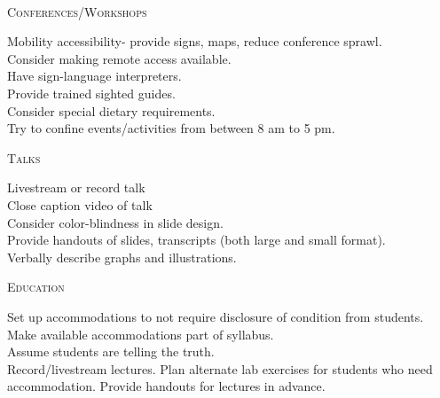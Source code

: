\documentclass{beamer}
\begin{document}
\begin{center}
\begin{minipage}{0.42\linewidth}
~\\
\begin{Large}
\textsc{Conferences/Workshops\\}
\end{Large}
Mobility accessibility- provide signs, maps, reduce conference sprawl.\\
Consider making remote access available.\\
Have sign-language interpreters.\\
Provide trained sighted guides.\\
Consider special dietary requirements.\\
Try to confine events/activities from between 8 am to 5 pm.\\

\begin{Large}
\textsc{Talks\\}
\end{Large}
Livestream or record talk\\
Close caption video of talk\\
Consider color-blindness in slide design.\\
Provide handouts of slides, transcripts (both large and small format).\\
Verbally describe graphs and illustrations.\\

\begin{Large}
\textsc{Education\\}
\end{Large}
Set up accommodations to not require disclosure of condition from students.\\
Make available accommodations part of syllabus.\\
Assume students are telling the truth.\\
Record/livestream lectures.
Plan alternate lab exercises for students who need accommodation.
Provide handouts for lectures in advance.\\


\end{minipage}
\end{center}
\end{document}
